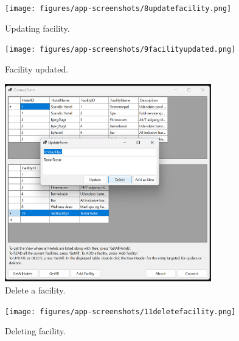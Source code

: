 \begin{figure}
    \centering
    \texttt{[image: figures/app-screenshots/8updatefacility.png]}
    \caption{Updating facility.}
    \label{fig:8updatefacility}
\end{figure}

\begin{figure}
    \centering
    \texttt{[image: figures/app-screenshots/9facilityupdated.png]}
    \caption{Facility updated.}
    \label{fig:9facilityupdated}
\end{figure}

\begin{figure}
    \centering
    \includegraphics[width=0.8\textwidth]{figures/app-screenshots/10deleteform.png}
    \caption{Delete a facility.}
    \label{fig:10deleteform}
\end{figure}

\begin{figure}
    \centering
    \texttt{[image: figures/app-screenshots/11deletefacility.png]}
    \caption{Deleting facility.}
    \label{fig:11deletefacility}
\end{figure}